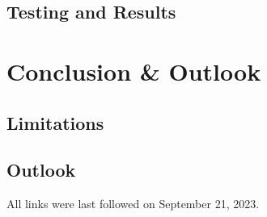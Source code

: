 \documentclass[
  a4paper,  %
  twoside,  %
  bibliography=totoc,
  headsepline,
  cleardoublepage=empty,
  parskip=half,
  draft=false
]{scrbook}
\begin{document}
\section{Testing and Results}


\chapter{Conclusion \& Outlook}

\section{Limitations}

\section{Outlook}


\printbibliography

All links were last followed on September 21, 2023.

\appendix



\pagestyle{empty}
\renewcommand*{\chapterpagestyle}{empty}
\Versicherung
\end{document}
